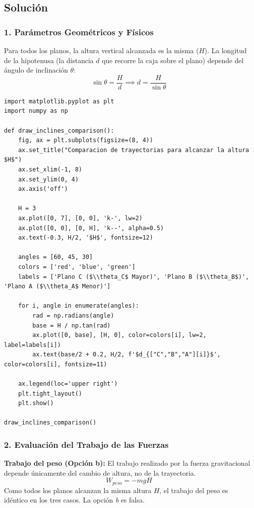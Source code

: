 \documentclass[12pt, a4paper]{article}
\begin{document}
\subsection*{Solución}

\subsubsection*{1. Parámetros Geométricos y Físicos}
Para todos los planos, la altura vertical alcanzada es la misma ($H$).
La longitud de la hipotenusa (la distancia $d$ que recorre la caja sobre el plano) depende del ángulo de inclinación $\theta$:
$$\sin\theta = \frac{H}{d} \implies d = \frac{H}{\sin\theta}$$

\begin{lstlisting}
import matplotlib.pyplot as plt
import numpy as np

def draw_inclines_comparison():
    fig, ax = plt.subplots(figsize=(8, 4))
    ax.set_title("Comparacion de trayectorias para alcanzar la altura $H$")
    ax.set_xlim(-1, 8)
    ax.set_ylim(0, 4)
    ax.axis('off')

    H = 3
    ax.plot([0, 7], [0, 0], 'k-', lw=2)
    ax.plot([0, 0], [0, H], 'k--', alpha=0.5)
    ax.text(-0.3, H/2, '$H$', fontsize=12)

    angles = [60, 45, 30]
    colors = ['red', 'blue', 'green']
    labels = ['Plano C ($\\theta_C$ Mayor)', 'Plano B ($\\theta_B$)', 'Plano A ($\\theta_A$ Menor)']
    
    for i, angle in enumerate(angles):
        rad = np.radians(angle)
        base = H / np.tan(rad)
        ax.plot([0, base], [H, 0], color=colors[i], lw=2, label=labels[i])
        ax.text(base/2 + 0.2, H/2, f'$d_{["C","B","A"][i]}$', color=colors[i], fontsize=11)
        
    ax.legend(loc='upper right')
    plt.tight_layout()
    plt.show()

draw_inclines_comparison()
\end{lstlisting}

\subsubsection*{2. Evaluación del Trabajo de las Fuerzas}

\textbf{Trabajo del peso (Opción b):}
El trabajo realizado por la fuerza gravitacional depende únicamente del cambio de altura, no de la trayectoria.
$$W_{peso} = -mgH$$
Como todos los planos alcanzan la misma altura $H$, el trabajo del peso es idéntico en los tres casos. La opción \textit{b} es falsa.
\end{document}
